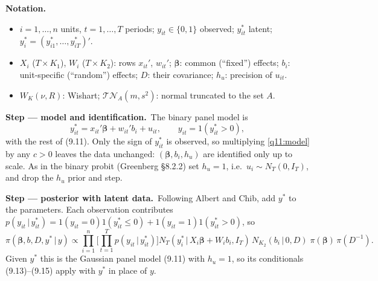 \documentclass[11pt,a4paper]{article}
\numberwithin{equation}{questao}
\newenvironment{notacao}{\par\smallskip\noindent\textbf{Notation.}\begin{itemize}[leftmargin=1.4em,topsep=1pt,itemsep=0pt]\small}{\end{itemize}}
\newcommand{\passo}[2]{\par\smallskip\noindent\textbf{Step --- #1.}~#2}
\newcommand{\TN}{\mathcal{TN}}
\begin{document}
\begin{sol}
\begin{notacao}
\item $i=1,\dots,n$ units, $t=1,\dots,T$ periods; $y_{it}\in\{0,1\}$ observed; $y_{it}^*$ latent; $y_i^*=(y_{i1}^*,\dots,y_{iT}^*)'$.
\item $X_i$ ($T\times K_1$), $W_i$ ($T\times K_2$): rows $x_{it}'$, $w_{it}'$; $\boldsymbol\beta$: common (``fixed'') effects; $b_i$: unit-specific (``random'') effects; $D$: their covariance; $h_u$: precision of $u_{it}$.
\item $W_{K}(\nu,R)$: Wishart; $\TN_{A}(m,s^2)$: normal truncated to the set $A$.
\end{notacao}

\passo{model and identification}{The binary panel model is
\begin{equation}
y_{it}^*=x_{it}'\boldsymbol\beta+w_{it}'b_i+u_{it},\qquad y_{it}=1(y_{it}^*>0), \label{q11:model}
\end{equation}
with the rest of (9.11). Only the sign of $y_{it}^*$ is observed, so multiplying \eqref{q11:model} by any
$c>0$ leaves the data unchanged: $(\boldsymbol\beta,b_i,h_u)$ are identified only up to scale. As in the
binary probit (Greenberg §8.2.2) set $h_u=1$, i.e.\ $u_i\sim N_T(0,I_T)$, and drop the $h_u$ prior and step.}

\passo{posterior with latent data}{Following Albert and Chib, add $y^*$ to the parameters. Each observation contributes
$p(y_{it}\,|\,y_{it}^*)=1(y_{it}=0)1(y_{it}^*\le0)+1(y_{it}=1)1(y_{it}^*>0)$, so
\begin{equation}
\pi(\boldsymbol\beta,b,D,y^*\,|\,y)\propto\prod_{i=1}^n\Big[\prod_{t=1}^Tp(y_{it}\,|\,y_{it}^*)\Big]N_T(y_i^*\,|\,X_i\boldsymbol\beta+W_ib_i,I_T)\,N_{K_2}(b_i\,|\,0,D)\;\pi(\boldsymbol\beta)\,\pi(D^{-1}). \label{q11:post}
\end{equation}
Given $y^*$ this is the Gaussian panel model (9.11) with $h_u=1$, so its conditionals (9.13)--(9.15) apply with $y^*$ in place of $y$.}


\end{sol}
\end{document}
